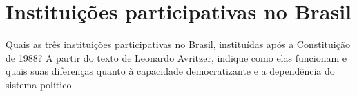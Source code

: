 \section{Instituições participativas no Brasil}

Quais as três instituições participativas no Brasil, instituídas após a Constituição de 1988? A partir do texto de Leonardo Avritzer, indique como elas funcionam e quais suas diferenças quanto à capacidade democratizante e a dependência do sistema político.